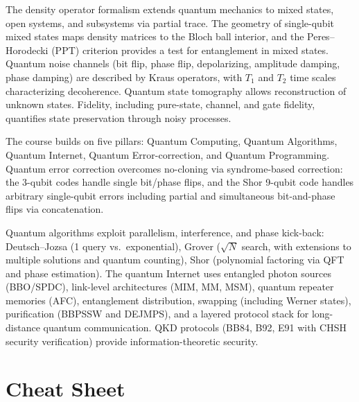 \documentclass[10pt,a4paper]{article}
\begin{document}
The density operator formalism extends quantum mechanics to mixed states, open systems, and subsystems via partial trace. The geometry of single-qubit mixed states maps density matrices to the Bloch ball interior, and the Peres--Horodecki (PPT) criterion provides a test for entanglement in mixed states. Quantum noise channels (bit flip, phase flip, depolarizing, amplitude damping, phase damping) are described by Kraus operators, with $T_1$ and $T_2$ time scales characterizing decoherence. Quantum state tomography allows reconstruction of unknown states. Fidelity, including pure-state, channel, and gate fidelity, quantifies state preservation through noisy processes.

The course builds on five pillars: Quantum Computing, Quantum Algorithms, Quantum Internet, Quantum Error-correction, and Quantum Programming. Quantum error correction overcomes no-cloning via syndrome-based correction: the 3-qubit codes handle single bit/phase flips, and the Shor 9-qubit code handles arbitrary single-qubit errors including partial and simultaneous bit-and-phase flips via concatenation.

Quantum algorithms exploit parallelism, interference, and phase kick-back: Deutsch--Jozsa (1 query vs.\ exponential), Grover ($\sqrt{N}$ search, with extensions to multiple solutions and quantum counting), Shor (polynomial factoring via QFT and phase estimation). The quantum Internet uses entangled photon sources (BBO/SPDC), link-level architectures (MIM, MM, MSM), quantum repeater memories (AFC), entanglement distribution, swapping (including Werner states), purification (BBPSSW and DEJMPS), and a layered protocol stack for long-distance quantum communication. QKD protocols (BB84, B92, E91 with CHSH security verification) provide information-theoretic security.

\newpage
\section*{Cheat Sheet}
\end{document}
